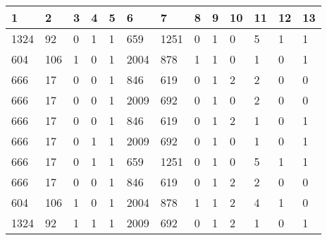 \begin{table}[H]
\begin{tabular}{|l|l|l|l|l|l|l|l|l|l|l|l|l|}
\hline
\textbf{1} & \textbf{2} & \textbf{3} & \textbf{4} & \textbf{5} & \textbf{6} & \textbf{7} & \textbf{8} & \textbf{9} & \textbf{10} & \textbf{11} & \textbf{12} & \textbf{13} \\ \hline
1324  &  92  &  0  &  1  &  1  &  659  &  1251  &  0  &  1  &  0  &  {\color[HTML]{FE0000}5}  &  1  &  1 \\ \hline
604  &  106  &  1  &  0  &  1  &  2004  &  878  &  1  &  1  &  0  &  1  &  0  &  1 \\ \hline
666  &  17  &  0  &  0  &  1  &  846  &  619  &  0  &  1  &  2  &  2  &  0  &  0 \\ \hline
666  &  17  &  0  &  0  &  1  &  2009  &  692  &  0  &  1  &  0  &  2  &  0  &  0 \\ \hline
666  &  17  &  0  &  0  &  1  &  846  &  619  &  0  &  1  &  2  &  1  &  0  &  1 \\ \hline
666  &  17  &  0  &  1  &  1  &  2009  &  692  &  0  &  1  &  0  &  1  &  0  &  1 \\ \hline
666  &  17  &  0  &  1  &  1  &  659  &  1251  &  0  &  1  &  0  &  {\color[HTML]{FE0000}5}  &  1  &  1 \\ \hline
666  &  17  &  0  &  0  &  1  &  846  &  619  &  0  &  1  &  2  &  2  &  0  &  0 \\ \hline
604  &  106  &  1  &  0  &  1  &  2004  &  878  &  1  &  1  &  2  &  {\color[HTML]{FE0000}4}  &  1  &  0 \\ \hline
1324  &  92  &  1  &  1  &  1  &  2009  &  692  &  0  &  1  &  2  &  1  &  0  &  1 \\ \hline
\end{tabular}
\end{table}

